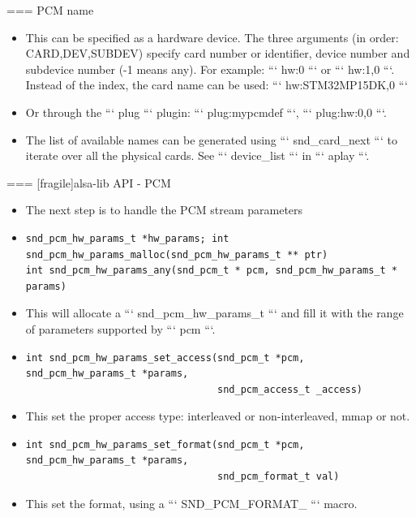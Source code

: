 === {PCM name}
  \begin{itemize}
  \item This can be specified as a hardware device. The three
    arguments (in order: CARD,DEV,SUBDEV) specify card number or
    identifier, device number and subdevice number (-1 means any). For
    example: ``` hw:0 ``` or ``` hw:1,0 ```. Instead of the index, the
    card name can be used: ``` hw:STM32MP15DK,0 ```
  \item Or through the ``` plug ``` plugin: ``` plug:mypcmdef ```,
    ``` plug:hw:0,0 ```.
  \item The list of available names can be generated using
    ``` snd_card_next ``` to iterate over all the physical cards. See
    ``` device_list ``` in ``` aplay ```.
  \end{itemize}


=== [fragile]{alsa-lib API - PCM}
  \begin{itemize}
  \item The next step is to handle the PCM stream parameters
  \item
    \begin{block}{}
    \fontsize{9}{9}\selectfont
      \begin{verbatim}
snd_pcm_hw_params_t *hw_params; int snd_pcm_hw_params_malloc(snd_pcm_hw_params_t ** ptr)
int snd_pcm_hw_params_any(snd_pcm_t * pcm, snd_pcm_hw_params_t * params)
      \end{verbatim}
      \end{block}
    \item This will allocate a ``` snd_pcm_hw_params_t ``` and fill it
      with the range of parameters supported by ``` pcm ```.
  \item
    \begin{block}{}
    \fontsize{9}{9}\selectfont
      \begin{verbatim}
int snd_pcm_hw_params_set_access(snd_pcm_t *pcm, snd_pcm_hw_params_t *params,
                                 snd_pcm_access_t _access)
      \end{verbatim}
    \end{block}
    \item This set the proper access type: interleaved or
      non-interleaved, mmap or not.
  \item
    \begin{block}{}
    \fontsize{9}{9}\selectfont
      \begin{verbatim}
int snd_pcm_hw_params_set_format(snd_pcm_t *pcm, snd_pcm_hw_params_t *params,
                                 snd_pcm_format_t val)
      \end{verbatim}
    \end{block}
    \item This set the format, using a ``` SND_PCM_FORMAT_ ``` macro.
  \end{itemize}


